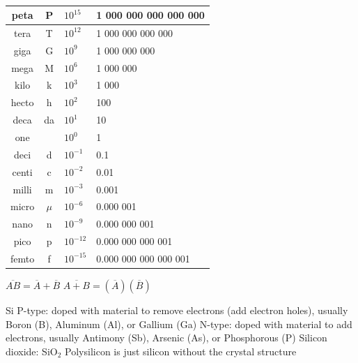 \documentclass[12pt]{article}
\begin{document}
\begin{spacing}{0.8}
\begin{multicols*}{2}
\begin{flushleft}
\begin{outline}[longenum]
 \\
\begin{tabular}{|c c l l|}                                   \hline
peta  & P     & $10^{ 15}$ & \hfill 1 000 000 000 000 000 \\ \hline
tera  & T     & $10^{ 12}$ & \hfill     1 000 000 000 000 \\ \hline
giga  & G     & $10^{  9}$ & \hfill         1 000 000 000 \\ \hline
mega  & M     & $10^{  6}$ & \hfill             1 000 000 \\ \hline
kilo  & k     & $10^{  3}$ & \hfill                 1 000 \\ \hline
hecto & h     & $10^{  2}$ & \hfill                   100 \\ \hline
deca  & da    & $10^{  1}$ & \hfill                    10 \\ \hline
one   &       & $10^{ 0 }$ & \hfill       1 \hfill \hfill \\ \hline
deci  & d     & $10^{- 1}$ & 0.1                          \\ \hline
centi & c     & $10^{- 2}$ & 0.01                         \\ \hline
milli & m     & $10^{- 3}$ & 0.001                        \\ \hline
micro & $\mu$ & $10^{- 6}$ & 0.000 001                    \\ \hline
nano  & n     & $10^{- 9}$ & 0.000 000 001                \\ \hline
pico  & p     & $10^{-12}$ & 0.000 000 000 001            \\ \hline
femto & f     & $10^{-15}$ & 0.000 000 000 000 001        \\ \hline
\end{tabular}

  \1 $\overline{AB}=\overline {A}+\overline{B}$
  \1 $\overline{A+B}=(\overline{A})(\overline{B})$

  \1 Si
  \1 P-type:
    \2 doped with material to remove electrons (add electron holes), usually Boron (B), Aluminum (Al), or Gallium (Ga)
  \1 N-type:
    \2 doped with material to add electrons, usually Antimony (Sb), Arsenic (As), or Phosphorous (P)
  \1 Silicon dioxide: SiO$_2$
  \1 Polysilicon is just silicon without the crystal structure


\end{outline}
\end{flushleft}
\end{multicols*}
\end{spacing}
\end{document}
